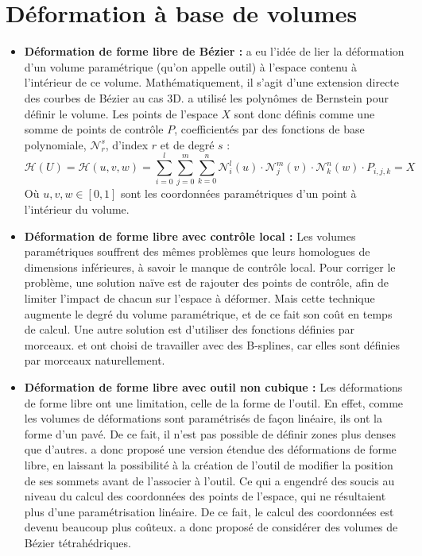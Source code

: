\section{Déformation à base de volumes}
\begin{itemize}
\item{\textbf{Déformation de forme libre de Bézier :}} \cite{SP86} a
  eu l'idée de lier la déformation d'un volume paramétrique (qu'on
  appelle outil) à l'espace contenu à l'intérieur de ce
  volume. Mathématiquement, il s'agit d'une extension directe des
  courbes de Bézier au cas 3D. \cite{SP86} a utilisé les polynômes de
  Bernstein pour définir le volume. Les points de l'espace $X$ sont
  donc définis comme une somme de points de contrôle $P$,
  coefficientés par des fonctions de base polynomiale,
  $\mathcal{N}_r^s$, d'index $r$ et de degré $s$ :
  \begin{equation}
    \mathcal{H}(U) = \mathcal{H}(u,v,w) = 
    \sum_{i=0}^l \sum_{j=0}^m \sum_{k=0}^n
    \mathcal{N}_i^l(u) \cdot \mathcal{N}_j^m(v) \cdot \mathcal{N}_k^n(w) \cdot P_{i,j,k} = X
  \end{equation}
  Où $u,v,w \in [0,1]$ sont les coordonnées paramétriques d'un point à
  l'intérieur du volume.
\item{\textbf{Déformation de forme libre avec contrôle local :}} Les
  volumes paramétriques souffrent des mêmes problèmes que leurs
  homologues de dimensions inférieures, à savoir le manque de contrôle
  local. Pour corriger le problème, une solution naïve est de rajouter
  des points de contrôle, afin de limiter l'impact de chacun sur
  l'espace à déformer. Mais cette technique augmente le degré du
  volume paramétrique, et de ce fait son coût en temps de calcul. Une
  autre solution est d'utiliser des fonctions définies par
  morceaux. \cite{GP89} et \cite{Com89} ont choisi de travailler avec
  des B-splines, car elles sont définies par morceaux naturellement.
\item{\textbf{Déformation de forme libre avec outil non cubique :}}
  Les déformations de forme libre ont une limitation, celle de la
  forme de l'outil. En effet, comme les volumes de déformations sont
  paramétrisés de façon linéaire, ils ont la forme d'un pavé. De ce
  fait, il n'est pas possible de définir zones plus denses que
  d'autres. \cite{Coq90} a donc proposé une version étendue des
  déformations de forme libre, en laissant la possibilité à la
  création de l'outil de modifier la position de ses sommets avant de
  l'associer à l'outil. Ce qui a engendré des soucis au niveau du
  calcul des coordonnées des points de l'espace, qui ne résultaient
  plus d'une paramétrisation linéaire. De ce fait, le calcul des
  coordonnées est devenu beaucoup plus coûteux. \cite{BBT97} a donc
  proposé de considérer des volumes de Bézier tétrahédriques.
\end{itemize}


